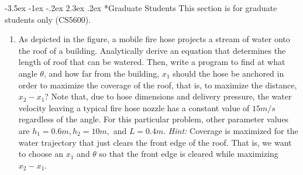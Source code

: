 \documentclass[11pt]{article}
\makeatletter
\renewcommand\section{\@startsection{section}{1}{\z@}%
                                  {-3.5ex \@plus -1ex \@minus -.2ex}%
                                  {2.3ex \@plus.2ex}%
                                  {\normalfont\large\bfseries}}
\renewcommand\section{\@startsection{section}{1}{\z@}%
                                  {-3.5ex \@plus -1ex \@minus -.2ex}%
                                  {2.3ex \@plus.2ex}%
                                  {\normalfont\large\bfseries}}
\makeatother
\begin{document}
\section*{Graduate Students}
This section is for graduate students only (CS5600). 
\begin{enumerate}
    \begin{figure}[h]
    \centering
    \texttt{[image: Picture2.png]}
    \end{figure}
    \item As depicted in the figure, a mobile fire hose projects a stream of water onto the roof of a building. Analytically derive an equation that determines the length of roof that can be watered. Then, write a program to find at what angle $\theta$, and how far from the building, $x_1$ should the hose be anchored in order to maximize the coverage of the roof, that is, to maximize the distance, $x_2 - x_1$? Note that, due to hose dimensions and delivery pressure, the water velocity leaving a typical fire hose nozzle has a constant value of $15 m/s$ regardless of the angle. For this particular problem, other parameter values are $h_1 = 0.6 m, h_2 = 10 m,$ and $L=0.4 m$. \textit{Hint:} Coverage is maximized for the water trajectory that just clears the front edge of the roof. That is, we want to choose an $x_1$ and $\theta$ so that the front edge is cleared while maximizing $x_2 - x_1$.

\end{enumerate}
\end{document}
